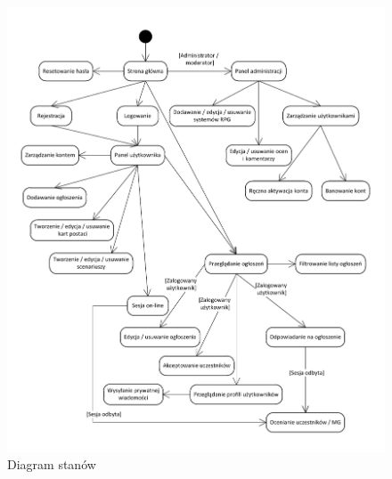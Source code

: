 \begin{figure}[h!]

\begin{center}
\centerline{\includegraphics[scale=1]{./img/STD}}
\caption[Diagram stanów]{Diagram stanów}
\label{fig:STD}
\end{center}
\end{figure}
